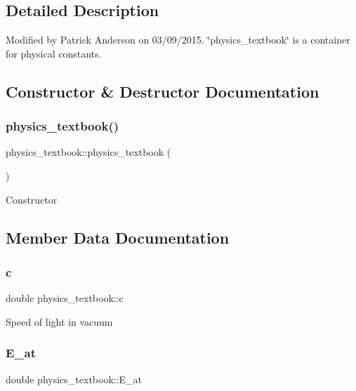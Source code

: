 \subsection{Detailed Description}
Modified by Patrick Anderson on 03/09/2015. \char`\"{}physics\+\_\+textbook\char`\"{} is a container for physical constants. 

\subsection{Constructor \& Destructor Documentation}
\mbox{\label{classphysics__textbook_a89b6993c2aecf444cd2fa540c73a110b}} 
\subsubsection{\texorpdfstring{physics\+\_\+textbook()}{physics\_textbook()}}
{\footnotesize\ttfamily physics\+\_\+textbook\+::physics\+\_\+textbook (\begin{DoxyParamCaption}{ }\end{DoxyParamCaption})}

Constructor 

\subsection{Member Data Documentation}
\mbox{\label{classphysics__textbook_a3c6dd19f14166d6c90d6f53aa4e31885}} 
\subsubsection{\texorpdfstring{c}{c}}
{\footnotesize\ttfamily double physics\+\_\+textbook\+::c}

Speed of light in vacuum \mbox{\label{classphysics__textbook_aed1451ff3400dce39969e5ac319f033a}} 
\subsubsection{\texorpdfstring{E\+\_\+at}{E\_at}}
{\footnotesize\ttfamily double physics\+\_\+textbook\+::\+E\+\_\+at}

